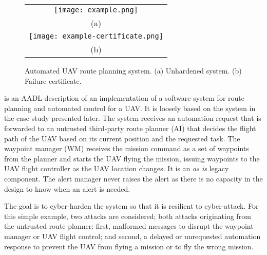 \begin{figure*}
  \begin{center}
    \begin{tabular}{c}
      \texttt{[image: example.png]} \\
      (a) \\
      \texttt{[image: example-certificate.png]} \\
      (b)
    \end{tabular}
  \end{center}
\caption{Automated UAV route planning system. (a) Unhardened system. (b) Failure certificate.}
\label{fig:example}
\end{figure*}

 is an AADL description of an implementation of a software system for route planning and automated control for a UAV. It is loosely based on the system in the case study presented later. The system receives an automation request that is forwarded to an untrusted third-party route planner (AI) that decides the flight path of the UAV based on its current position and the requested task. The waypoint manager (WM) receives the mission command as a set of waypoints from the planner and starts the UAV flying the mission, issuing waypoints to the UAV flight controller as the UAV location changes. It is an \emph{as is} legacy component. The alert manager never raises the alert as there is no capacity in the design to know when an alert is needed.

The goal is to cyber-harden the system so that it is resilient to cyber-attack. For this simple example, two attacks are considered; both attacks originating from the untrusted route-planner: first, malformed messages to disrupt the waypoint manager or UAV flight control; and second, a delayed or unrequested automation response to prevent the UAV from flying a mission or to fly the wrong mission.


